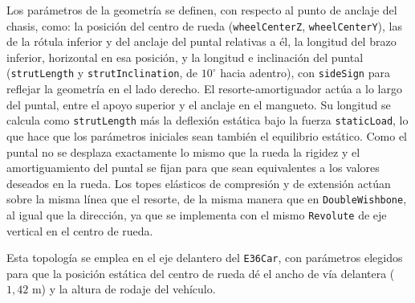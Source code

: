 Los parámetros de la geometría se definen, con respecto al punto de anclaje del chasis, como: la posición del centro de rueda (\verb|wheelCenterZ|, \verb|wheelCenterY|), las de la rótula inferior y del anclaje del puntal relativas a él, la longitud del brazo inferior, horizontal en esa posición, y la longitud e inclinación del puntal (\verb|strutLength| y \verb|strutInclination|, de $10^\circ$ hacia adentro), con \verb|sideSign| para reflejar la geometría en el lado derecho. El resorte-amortiguador actúa a lo largo del puntal, entre el apoyo superior y el anclaje en el mangueto. Su longitud se calcula como  \verb|strutLength| más la deflexión estática bajo la fuerza \verb|staticLoad|, lo que hace que los parámetros iniciales sean también el equilibrio estático. Como el puntal no se desplaza exactamente lo mismo que la rueda la rigidez y el amortiguamiento del puntal se fijan para que sean equivalentes a los valores deseados en la rueda.  Los topes elásticos de compresión y de extensión actúan sobre la misma línea que el resorte, de la misma manera que en  \verb|DoubleWishbone|, al igual que la dirección, ya que se implementa con el mismo \verb|Revolute| de eje vertical en el centro de rueda.

Esta topología se emplea en el eje delantero del \verb|E36Car|, con parámetros elegidos para que la posición estática del centro de rueda dé el ancho de vía delantera ($1{,}42$ m) y la altura de rodaje del vehículo.\\


